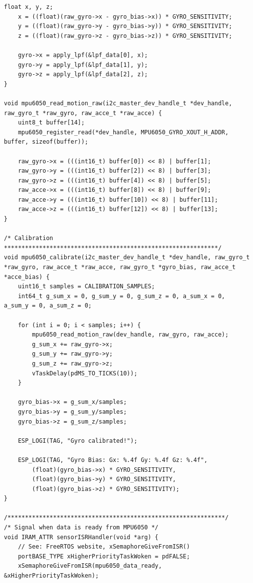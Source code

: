\begin{lstlisting}[caption={Register Read}]
    float x, y, z; 
    x = ((float)(raw_gyro->x - gyro_bias->x)) * GYRO_SENSITIVITY;
    y = ((float)(raw_gyro->y - gyro_bias->y)) * GYRO_SENSITIVITY;
    z = ((float)(raw_gyro->z - gyro_bias->z)) * GYRO_SENSITIVITY;

    gyro->x = apply_lpf(&lpf_data[0], x);
    gyro->y = apply_lpf(&lpf_data[1], y);
    gyro->z = apply_lpf(&lpf_data[2], z);
}

void mpu6050_read_motion_raw(i2c_master_dev_handle_t *dev_handle, raw_gyro_t *raw_gyro, raw_acce_t *raw_acce) {
    uint8_t buffer[14];
    mpu6050_register_read(*dev_handle, MPU6050_GYRO_XOUT_H_ADDR, buffer, sizeof(buffer));

    raw_gyro->x = (((int16_t) buffer[0]) << 8) | buffer[1];
    raw_gyro->y = (((int16_t) buffer[2]) << 8) | buffer[3];
    raw_gyro->z = (((int16_t) buffer[4]) << 8) | buffer[5];
    raw_acce->x = (((int16_t) buffer[8]) << 8) | buffer[9];
    raw_acce->y = (((int16_t) buffer[10]) << 8) | buffer[11];
    raw_acce->z = (((int16_t) buffer[12]) << 8) | buffer[13];
}

/* Calibration *************************************************************/
void mpu6050_calibrate(i2c_master_dev_handle_t *dev_handle, raw_gyro_t *raw_gyro, raw_acce_t *raw_acce, raw_gyro_t *gyro_bias, raw_acce_t *acce_bias) {
    uint16_t samples = CALIBRATION_SAMPLES;
    int64_t g_sum_x = 0, g_sum_y = 0, g_sum_z = 0, a_sum_x = 0, a_sum_y = 0, a_sum_z = 0;

    for (int i = 0; i < samples; i++) {
        mpu6050_read_motion_raw(dev_handle, raw_gyro, raw_acce);
        g_sum_x += raw_gyro->x;
        g_sum_y += raw_gyro->y;
        g_sum_z += raw_gyro->z;
        vTaskDelay(pdMS_TO_TICKS(10)); 
    }

    gyro_bias->x = g_sum_x/samples;
    gyro_bias->y = g_sum_y/samples;
    gyro_bias->z = g_sum_z/samples;

    ESP_LOGI(TAG, "Gyro calibrated!");

    ESP_LOGI(TAG, "Gyro Bias: Gx: %.4f Gy: %.4f Gz: %.4f",
        (float)(gyro_bias->x) * GYRO_SENSITIVITY,
        (float)(gyro_bias->y) * GYRO_SENSITIVITY,
        (float)(gyro_bias->z) * GYRO_SENSITIVITY);
}

/**************************************************************/
/* Signal when data is ready from MPU6050 */
void IRAM_ATTR sensorISRHandler(void *arg) {
    // See: FreeRTOS website, xSemaphoreGiveFromISR()
    portBASE_TYPE xHigherPriorityTaskWoken = pdFALSE;
    xSemaphoreGiveFromISR(mpu6050_data_ready, &xHigherPriorityTaskWoken);


\end{lstlisting}
